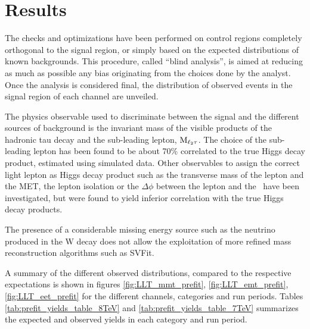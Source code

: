 \section{Results}

The checks and optimizations have been performed on control regions completely orthogonal to the signal region, or simply based on the expected distributions of known backgrounds. This procedure, called ``blind analysis'', is aimed at reducing as much as possible any bias originating from the choices done by the analyst. 
Once the analysis is considered final, the distribution of observed events in the signal region of each channel are unveiled. 

The physics observable used to discriminate between the signal and the different sources of background is the invariant mass of the visible products of the hadronic tau decay and the sub-leading lepton, $\rm{M}_{\ell_2 \tau}$. The choice of the sub-leading lepton has been found to be about 70\% correlated to the true Higgs decay product, estimated using simulated data. Other observables to assign the correct light lepton as Higgs decay product such as the transverse mass of the lepton and the MET, the lepton isolation or the $\Delta\phi$ between the lepton and the \MET\ have been investigated, but were found to yield inferior correlation with the true Higgs decay products.

The presence of a considerable missing energy source such as the neutrino produced in the W decay does not allow the exploitation of more refined mass reconstruction algorithms such as SVFit.

A summary of the different observed distributions, compared to the respective expectations is shown in figures \ref{fig:LLT_mmt_prefit}, \ref{fig:LLT_emt_prefit}, \ref{fig:LLT_eet_prefit} for the different channels, categories and run periods. Tables \ref{tab:prefit_yields_table_8TeV} and \ref{tab:prefit_yields_table_7TeV} summarizes the expected and observed yields in each category and run period.

